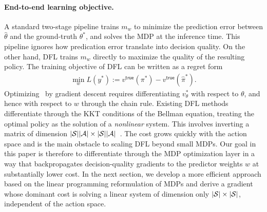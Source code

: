 \paragraph{End-to-end learning objective.}
A standard two-stage pipeline trains $m_w$ to minimize the prediction error between $\hat{\theta}$ and the ground-truth $\theta^*$, and solves the MDP at the inference time. This pipeline ignores how predication error translate into decision quality. On the other hand, DFL trains $m_w$ directly to maximize the quality of the resulting policy. The training objective of DFL can be written as a regret form
\begin{align}
    \min_{w} L(y^*) := v^{\mathsf{true}}(\pi^*) - v^{\mathsf{true}}(\hat{\pi}^*).
    \label{eq:dfl_obj}
\end{align}
Optimizing~ by gradient descent requires differentiating $v^*_\theta$ with respect to $\theta$, and hence with respect to $w$ through the chain rule. Existing DFL methods differentiate through the KKT conditions of the Bellman equation, treating the optimal policy as the solution of a \emph{nonlinear} system. This involves inverting a matrix of dimension $|{\mathcal{S}}||{\mathcal{A}}| \times |{\mathcal{S}}||{\mathcal{A}}|$~\citep{wang2021learning, amos2017optnet}. The cost grows quickly with the action space and is the main obstacle to scaling DFL beyond small MDPs. Our goal in this paper is therefore to differentiate through the MDP optimization layer in a way that backpropagates decision-quality gradients to the predictor weights $w$ at substantially lower cost. In the next section, we develop a more efficient approach based on the linear programming reformulation of MDPs and derive a gradient whose dominant cost is solving a linear system of dimension only $|{\mathcal{S}}| \times |{\mathcal{S}}|$, independent of the action space.
